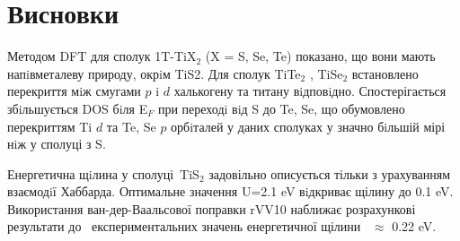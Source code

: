 \chapter*{Висновки}
Методом DFT для сполук 1T-TiX$_2$ (X = S, Se, Te) показано, що вони мають напiвметалеву природу, окрiм TiS2. Для сполук TiTe$_2$ , TiSe$_2$ встановлено перекриття мiж смугами $p$ i $d$ халькогену та титану вiдповiдно. Спостерігається збiльшується DOS бiля E$_F$ при переходi вiд S до Te, Se, що обумовлено перекриттям Ti $d$ та Te, Se $p$ орбiталей у даних сполуках у значно бiльшій мірі нiж у сполуці з S.

Енергетична щiлина у сполуці TiS$_2$ задовільно описується тільки з урахуванням взаємодiї Хаббарда. Оптимальне значення U=2.1 eV вiдкриває щілину до 0.1 eV. Використання ван-дер-Ваальсової поправки rVV10 наближає розрахункові результати до  експериментальних значень енергетичної щілини  $\approx$ 0.22 eV.
